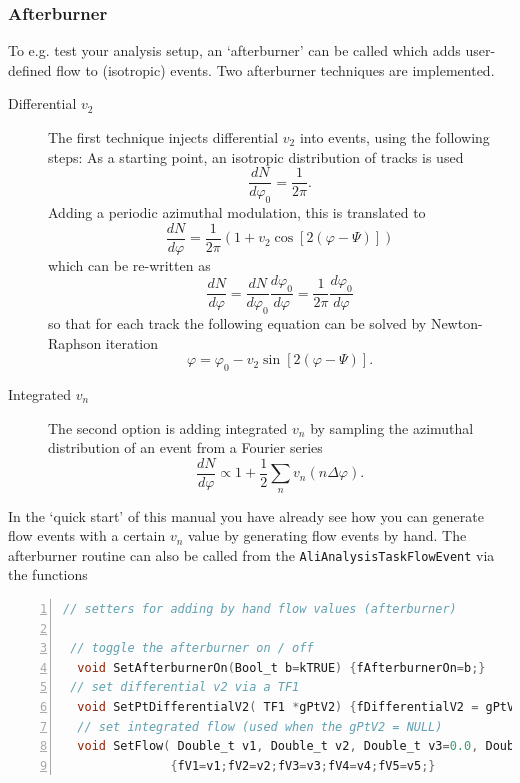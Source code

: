 \documentclass[a4paper]{book}
\numberwithin{equation}{subsection}
\begin{document}
  \subsubsection{Afterburner}
To e.g. test your analysis setup, an `afterburner' can be called which adds  user-defined flow to (isotropic) events. Two afterburner techniques are implemented.
\begin{description}
\item[Differential $v_2$] The first technique injects differential $v_2$ into events, using the following steps: As a starting point, an isotropic distribution of tracks is used
\begin{equation}
    \frac{dN}{d\varphi_0} = \frac{1}{2 \pi}.
\end{equation}
Adding a periodic azimuthal modulation, this is translated to
\begin{equation}
    \frac{dN}{d\varphi} = \frac{1}{2\pi}\left( 1 + v_2 \cos \left[ 2 \left( \varphi - \Psi \right) \right] \right)
\end{equation}
which can be re-written as
\begin{equation}
    \frac{dN}{d\varphi} = \frac{dN}{d\varphi_0}\frac{d\varphi_0}{d\varphi} = \frac{1}{2\pi}\frac{d\varphi_0}{d\varphi}
\end{equation}
so that for each track the following equation can be solved by Newton-Raphson iteration
\begin{equation}
    \varphi = \varphi_0 - v_2 \sin \left[ 2 \left( \varphi - \Psi \right) \right].
\end{equation}
\item[Integrated $v_n$] The second option is adding integrated $v_n$ by sampling the azimuthal distribution of an event from a Fourier series
\begin{equation}
\frac{dN}{d\varphi} \propto 1 + \frac{1}{2} \sum_n v_n \left( n \Delta \varphi \right).
\end{equation}
\end{description}
In the `quick start' of this manual you have already see how you can generate flow events with a certain $v_n$ value by generating flow events by hand. The afterburner routine can also be called from the \texttt{AliAnalysisTaskFlowEvent} via the functions
\begin{lstlisting}[language=C, numbers=left]
 // setters for adding by hand flow values (afterburner)
 
 // toggle the afterburner on / off
  void SetAfterburnerOn(Bool_t b=kTRUE) {fAfterburnerOn=b;}
 // set differential v2 via a TF1  
  void SetPtDifferentialV2( TF1 *gPtV2) {fDifferentialV2 = gPtV2;}
  // set integrated flow (used when the gPtV2 = NULL)
  void SetFlow( Double_t v1, Double_t v2, Double_t v3=0.0, Double_t v4=0.0, Double_t v5=0.0)
               {fV1=v1;fV2=v2;fV3=v3;fV4=v4;fV5=v5;}\end{lstlisting}
\end{document}
